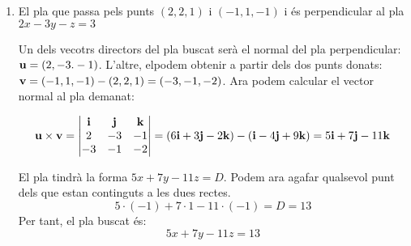 \begin{enumerate}
  \item El pla que passa pels punts $(2,2,1)$ i $(-1,1,-1)$ i és perpendicular al pla $2x-3y-z=3$

Un dels vecotrs directors del pla buscat serà el normal del pla perpendicular: $\textbf{u}=(2,-3.-1)$. L'altre, elpodem obtenir a partir dels dos punts donats: $\textbf{v}=(-1,1,-1)-(2,2,1)=(-3,-1,-2)$. Ara podem calcular el vector normal al pla demanat:

\[
\textbf{u} \times \textbf{v}=
\begin{vmatrix}
\textbf{i} & \textbf{j} & \textbf{k} \\
2 & -3 & -1\\
-3 & -1 & -2
\end{vmatrix}=
(6\textbf{i}+3\textbf{j}-2\textbf{k})-(\textbf{i}-4\textbf{j}+9\textbf{k})=5\textbf{i}+7\textbf{j}-11\textbf{k}
\]

El pla tindrà la forma $5x+7y-11z=D$. Podem ara agafar qualsevol punt dels que estan continguts a les dues rectes.
\[
5\cdot(-1)+7\cdot1-11\cdot(-1)=D=13
\]
Per tant, el pla buscat és:
\[
5x+7y-11z=13
\]


\end{enumerate}
